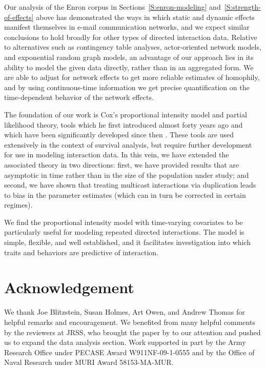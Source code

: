 \documentclass[final]{statsoc}
\begin{document}
Our analysis of the Enron corpus in Sections~\ref{S:enron-modeling}
and~\ref{S:strength-of-effects} above has demonstrated the ways in which
static and dynamic effects manifest themselves in e-mail communication
networks, and we expect similar conclusions to hold broadly for other types of
directed interaction data.  Relative to alternatives such as contingency table
analyses, actor-oriented network models, and exponential random graph models,
an advantage of our approach lies in its ability to model the given data
directly, rather than in an aggregated form.  We are able to adjust for
network effects to get more reliable estimates of homophily, and by using
continuous-time information we get precise quantification on the
time-dependent behavior of the network effects.

The foundation of our work is Cox's \citeyearpar{cox1972regression}
proportional intensity model and partial likelihood theory, tools
which he first introduced almost forty years ago and which have been
significantly developed since then \citep{cox1975partial,
fleming1991counting, andersen1993statistical, martinussen2006dynamic,
cook2007statistical}. These tools are used extensively in the context
of survival analysis, but require further development for use in
modeling interaction data. In this vein, we have extended the
associated theory in two directions: first, we have provided results
that are asymptotic in time rather than in the size of the population
under study; and second, we have shown that treating multicast
interactions via duplication leads to bias in the parameter estimates
(which can in turn be corrected in certain regimes).

We find the
proportional intensity model with time-varying covariates to be particularly
useful for modeling repeated directed interactions.  The model is
simple, flexible, and well established, and it facilitates investigation
into which traits and behaviors are predictive of interaction.


\section*{Acknowledgement}

We thank Joe Blitzstein, Susan Holmes, Art Owen, and Andrew Thomas for helpful
remarks and encouragement.  We benefited from many helpful comments by the
reviewers at JRSS, who brought the paper by \cite{butts2008relational} to our
attention and pushed us to expand the data analysis section.  Work supported
in part by the Army Research Office under PECASE Award W911NF-09-1-0555 and by
the Office of Naval Research under MURI Award 58153-MA-MUR.
\end{document}
